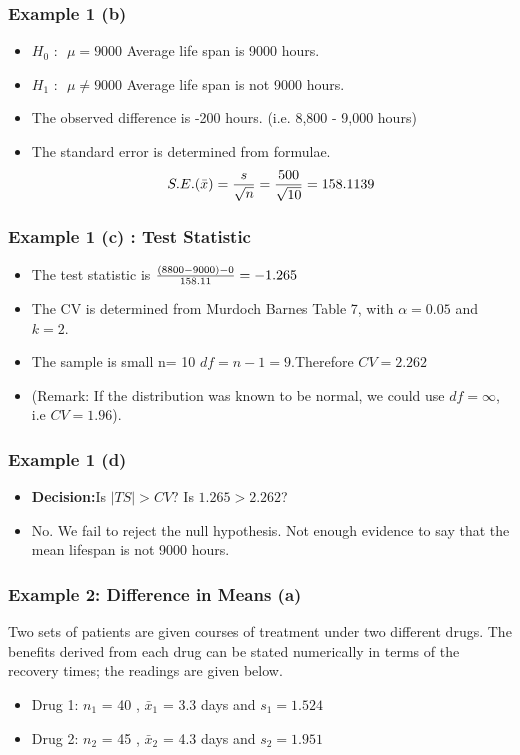 \begin{frame}
\frametitle{Example 1 (b) }
\large
\begin{itemize}
\item $H_0 \mbox{ : } $ $\mu = 9000$ Average life span is 9000 hours.
\item $H_1 \mbox{ : } $ $\mu \neq 9000$ Average life span is not 9000 hours.
\end{itemize}
\bigskip
\begin{itemize}
\item The observed difference is -200 hours. (i.e. 8,800 - 9,000 hours)
\item The standard error is determined from formulae.
\[ S.E.(\bar{x}) = {s \over \sqrt{n}} = {500 \over \sqrt{10}}  = 158.1139 \]
\end{itemize}
\end{frame}
\begin{frame}
\frametitle{Example 1 (c) : Test Statistic }
\large
\begin{itemize}
\item The test statistic is ${(8800-9000) -0 \over  158.11} = -1.265$
\item The CV is determined from Murdoch Barnes Table 7, with $\alpha = 0.05$ and $k = 2$.
\item The sample is small n= 10 $df = n-1 = 9$.Therefore $CV = 2.262$
\item (Remark: If the distribution was known to be normal, we could use $df = \infty$, i.e $CV = 1.96$).
\end{itemize}
\end{frame}
\begin{frame}
\frametitle{Example 1 (d) }
\large
\begin{itemize}


\item \textbf{Decision:}Is $|TS| >CV$? Is $1.265 > 2.262$?
\item No. We fail to reject the null hypothesis. Not enough evidence to say that the mean lifespan is not 9000 hours.
\end{itemize}
\end{frame}

\begin{frame}
\frametitle{Example 2: Difference in Means (a) }
Two sets of patients are given courses of treatment under two different drugs. The benefits
derived from each drug can be stated numerically in terms of the recovery times; the readings are given below.

\begin{itemize}
\item Drug 1:  $n_1$ = 40 , $\bar{x}_1$ = 3.3 days and $s_1 = 1.524$
\item Drug 2:  $n_2$ = 45 , $\bar{x}_2$ = 4.3 days and $s_2 = 1.951 $
\end{itemize}
\end{frame}

